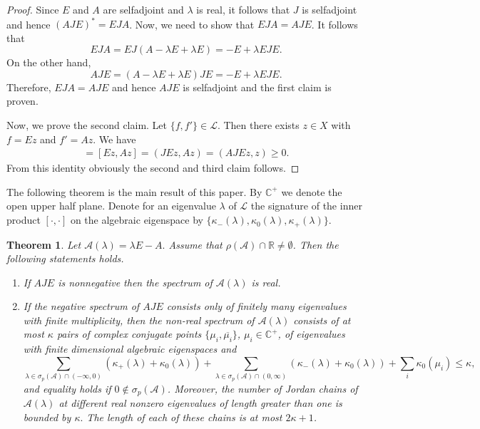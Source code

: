 \documentclass{birkjour}
\newtheorem{thm}{Theorem}[section]
\theoremstyle{definition}
\theoremstyle{remark}
\numberwithin{equation}{section}
\newcommand{\C}{\mathbb C}
\newcommand{\R}{\mathbb R}
\newcommand{\A}{\mathcal A}
\newcommand{\Ll}{\mathcal L}
\renewcommand{\geq}{\geqslant}
\begin{document}
\begin{proof}  
Since $E$ and $A$ are selfadjoint and $\lambda$ is real, it follows that $J$ is selfadjoint and hence $(AJE)^*=EJA$. Now, we need to show that $EJA=AJE$. It follows that 
$$
EJA=EJ(A-\lambda E+\lambda E) = -E+\lambda EJE.
$$
On the other hand, 
$$AJE=(A-\lambda E+\lambda E)JE = -E+\lambda E JE.
$$ 
Therefore, $EJA=AJE$ and hence $AJE$ is selfadjoint and the first claim is proven. 

Now, we prove the second claim.
Let $\{f,f'\} \in \mathcal{L}$. Then there exists $z\in X$ with $f=Ez$ and $f'=Az$. We have 
\begin{align*}
    [f,f']= [Ez,Az] = ( JEz, A z)= ( AJEz, z) \geq 0.
\end{align*} 
From this identity obviously the second and third claim follows.
\end{proof}


The following theorem is the main result of this paper. By $\C^+$ we denote the open upper half plane. Denote for an eigenvalue $\lambda$ of $\Ll$ the signature of the inner product $[\cdot, \cdot]$ on the algebraic eigenspace by $\{ \kappa_-(\lambda), \kappa_0(\lambda), \kappa_+(\lambda) \}.$
\begin{thm}\label{Theorem 4.5}
    Let $\A(\lambda) = \lambda E-A.$ Assume that $\rho(\A)\cap\R\neq \emptyset$. Then the following statements holds. 
    \begin{enumerate}
        \item If $AJE$ is nonnegative then the spectrum of $\A(\lambda)$ is real. 
        \item If the negative spectrum of $AJE$ consists only of finitely many eigenvalues with finite multiplicity, then the non-real spectrum of $\A(\lambda)$ consists of at most $\kappa$ pairs of complex conjugate points $\{\mu_i, \overline{\mu_i}\}$, $\mu_i\in \C^+$, of eigenvalues with finite dimensional algebraic eigenspaces and
        \begin{equation}
        \sum_{\lambda \in \sigma_p(\A)\cap (-\infty,0)}(\kappa_+(\lambda)+\kappa_0(\lambda))+ \sum_{\lambda \in \sigma_p(\A)\cap (0, \infty)}(\kappa_-(\lambda)+\kappa_0(\lambda))+ \sum_{i}\kappa_0(\mu_i)\leqslant \kappa,
    \end{equation} and equality holds if $0\notin \sigma_p(\A)$. Moreover, the  number of Jordan chains of $\A(\lambda)$ at different real nonzero eigenvalues of length greater than one is bounded by $\kappa.$ The length of each of these chains is at most $2\kappa +1$.
    \end{enumerate}
\end{thm}
\end{document}
